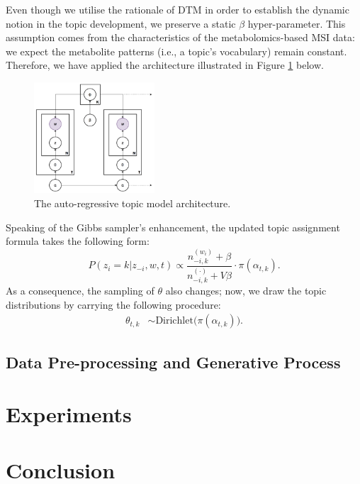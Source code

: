 \documentclass{mpaper}
\begin{document}
\par Even though we utilise the rationale of DTM in order to establish the dynamic notion in the topic development, we preserve a static $\beta$ hyper-parameter. This assumption comes from the characteristics of the metabolomics-based MSI data: we expect the metabolite patterns (i.e., a topic's vocabulary) remain constant. Therefore, we have applied the architecture illustrated in Figure \ref{fig:arch_ar} below.
\begin{figure}[H]
  \centering
  \includegraphics[width=0.4\textwidth]{ar-architecture.png}
  \caption{The auto-regressive topic model architecture.}
  \label{fig:arch_ar}
\end{figure}

\par Speaking of the Gibbs sampler's enhancement, the updated topic assignment formula takes the following form:
\begin{equation*}
P(z_i = k | z_{-i}, w, t) \propto \dfrac{n_{-i, k}^{(w_i)} + \beta}{n_{-i, k}^{(\cdot)} + V\beta}\cdot \pi(\alpha_{t,k}).
\end{equation*}
As a consequence, the sampling of $\theta$ also changes; now, we draw the topic distributions by carrying the following procedure:
\begin{align*}
\theta_{t,k} & \sim \mbox{Dirichlet}\big(\pi(\alpha_{t,k})\big).
\end{align*}

\subsection{Data Pre-processing and Generative Process}

\lipsum[1]

 \section{Experiments}


\lipsum[1-3]

\section{Conclusion}

\lipsum[1]



\end{document}

